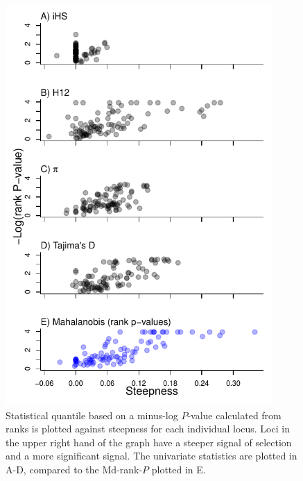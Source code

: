 \documentclass[12pt, oneside]{amsart}
\begin{document}
\newpage
\begin{figure}[h]
\begin{center}
\includegraphics[height=6in]{../figures_man2/F6-Dog_ScatterCompareSteepnessAndEmp_UniMulti.pdf}
\end{center}
\caption[]{Statistical quantile based on a minus-log $P$-value calculated from ranks is plotted against steepness for each individual locus. Loci in the upper right hand of the graph have a steeper signal of selection and a more significant signal. The univariate statistics are plotted in A-D, compared to the Md-rank-$P$ plotted in E.}
 \label{fig:???}
\end{figure}
\end{document}
